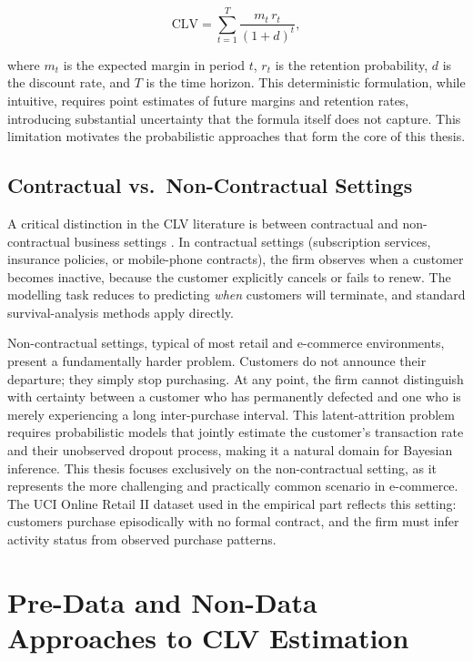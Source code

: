 \documentclass[12pt, a4paper, oneside]{report}
\begin{document}
\begin{equation}
  \text{CLV} = \sum_{t=1}^{T} \frac{m_t \, r_t}{(1 + d)^{t}},
  \label{eq:deterministic-clv}
\end{equation}

where $m_t$ is the expected margin in period $t$, $r_t$ is the retention probability, $d$ is the discount rate, and $T$ is the time horizon. This deterministic formulation, while intuitive, requires point estimates of future margins and retention rates, introducing substantial uncertainty that the formula itself does not capture. This limitation motivates the probabilistic approaches that form the core of this thesis.

\subsection{Contractual vs.\ Non-Contractual Settings}
\label{sec:contractual}

A critical distinction in the CLV literature is between contractual and non-contractual business settings \parencite{fader2009}. In contractual settings (subscription services, insurance policies, or mobile-phone contracts), the firm observes when a customer becomes inactive, because the customer explicitly cancels or fails to renew. The modelling task reduces to predicting \emph{when} customers will terminate, and standard survival-analysis methods apply directly.

Non-contractual settings, typical of most retail and e-commerce environments, present a fundamentally harder problem. Customers do not announce their departure; they simply stop purchasing. At any point, the firm cannot distinguish with certainty between a customer who has permanently defected and one who is merely experiencing a long inter-purchase interval. This latent-attrition problem requires probabilistic models that jointly estimate the customer's transaction rate and their unobserved dropout process, making it a natural domain for Bayesian inference. This thesis focuses exclusively on the non-contractual setting, as it represents the more challenging and practically common scenario in e-commerce. The UCI Online Retail II dataset used in the empirical part reflects this setting: customers purchase episodically with no formal contract, and the firm must infer activity status from observed purchase patterns.

\section{Pre-Data and Non-Data Approaches to CLV Estimation}
\label{sec:predata}
\end{document}
